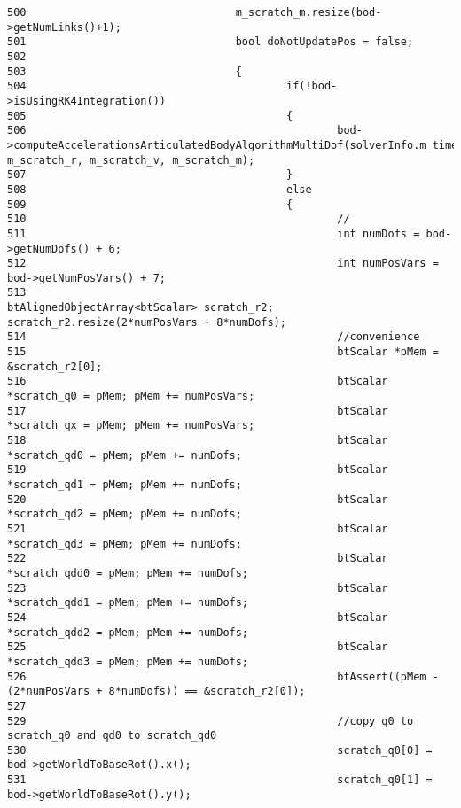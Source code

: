 \begin{Code}
\begin{verbatim}
500                                 m_scratch_m.resize(bod->getNumLinks()+1);
501                                 bool doNotUpdatePos = false;
502 
503                                 {
504                                         if(!bod->isUsingRK4Integration())
505                                         {
506                                                 bod->computeAccelerationsArticulatedBodyAlgorithmMultiDof(solverInfo.m_timeStep, m_scratch_r, m_scratch_v, m_scratch_m);
507                                         }
508                                         else
509                                         {                                               
510                                                 //
511                                                 int numDofs = bod->getNumDofs() + 6;
512                                                 int numPosVars = bod->getNumPosVars() + 7;
513                                                 btAlignedObjectArray<btScalar> scratch_r2; scratch_r2.resize(2*numPosVars + 8*numDofs);
514                                                 //convenience
515                                                 btScalar *pMem = &scratch_r2[0];
516                                                 btScalar *scratch_q0 = pMem; pMem += numPosVars;
517                                                 btScalar *scratch_qx = pMem; pMem += numPosVars;
518                                                 btScalar *scratch_qd0 = pMem; pMem += numDofs;
519                                                 btScalar *scratch_qd1 = pMem; pMem += numDofs;
520                                                 btScalar *scratch_qd2 = pMem; pMem += numDofs;
521                                                 btScalar *scratch_qd3 = pMem; pMem += numDofs;
522                                                 btScalar *scratch_qdd0 = pMem; pMem += numDofs;
523                                                 btScalar *scratch_qdd1 = pMem; pMem += numDofs;
524                                                 btScalar *scratch_qdd2 = pMem; pMem += numDofs;
525                                                 btScalar *scratch_qdd3 = pMem; pMem += numDofs;
526                                                 btAssert((pMem - (2*numPosVars + 8*numDofs)) == &scratch_r2[0]);
527 
529                                                 //copy q0 to scratch_q0 and qd0 to scratch_qd0
530                                                 scratch_q0[0] = bod->getWorldToBaseRot().x();
531                                                 scratch_q0[1] = bod->getWorldToBaseRot().y();

\end{verbatim}
\end{Code}
